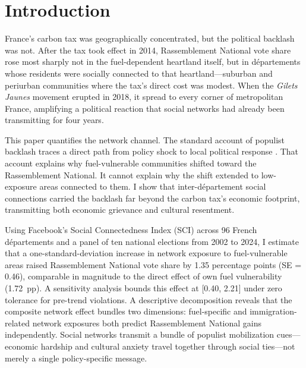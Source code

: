 \documentclass[12pt]{article}
\newcommand{\rn}{Rassemblement National}
\newcommand{\gj}{\textit{Gilets Jaunes}}
\newcommand{\dept}{d\'{e}partement}
\newcommand{\depts}{d\'{e}partements}
\begin{document}

\section{Introduction}
\label{sec:intro}

France's carbon tax was geographically concentrated, but the political backlash was not. After the tax took effect in 2014, \rn{} vote share rose most sharply not in the fuel-dependent heartland itself, but in \depts{} whose residents were socially connected to that heartland---suburban and periurban communities where the tax's direct cost was modest. When the \gj{} movement erupted in 2018, it spread to every corner of metropolitan France, amplifying a political reaction that social networks had already been transmitting for four years.

This paper quantifies the network channel. The standard account of populist backlash traces a direct path from policy shock to local political response \citep{autor2013china, colantone2018trade, fetzer2019did}. That account explains why fuel-vulnerable communities shifted toward the \rn{}. It cannot explain why the shift extended to low-exposure areas connected to them. I show that inter-\dept{} social connections carried the backlash far beyond the carbon tax's economic footprint, transmitting both economic grievance and cultural resentment.

Using Facebook's Social Connectedness Index (SCI) across 96 French \depts{} and a panel of ten national elections from 2002 to 2024, I estimate that a one-standard-deviation increase in network exposure to fuel-vulnerable areas raised \rn{} vote share by 1.35 percentage points (SE = 0.46), comparable in magnitude to the direct effect of own fuel vulnerability (1.72~pp). A \citet{rambachan2023more} sensitivity analysis bounds this effect at [0.40, 2.21] under zero tolerance for pre-trend violations. A descriptive decomposition reveals that the composite network effect bundles two dimensions: fuel-specific and immigration-related network exposures both predict \rn{} gains independently. Social networks transmit a bundle of populist mobilization cues---economic hardship and cultural anxiety travel together through social ties---not merely a single policy-specific message.
\end{document}
